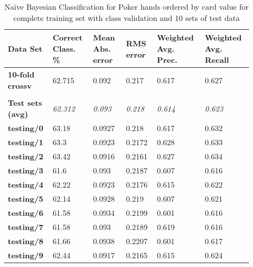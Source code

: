 \documentclass[10pt, a4paper]{article}
\begin{document}
\begin{table}[htbp]
  \centering
  \begin{tabular}{p{3cm}p{1.5cm}p{1.5cm}p{1.5cm}p{1.5cm}p{1.5cm}}
    \toprule
    \textbf{Data Set} & Correct Class. \% & Mean Abs. error & RMS error & Weighted Avg. Prec. & Weighted Avg. Recall \\
    \midrule
    \textbf{10-fold crossv} & 62.715 & 0.092 & 0.217 & 0.617 & 0.627 \\
    \textbf{} &       &       &       &       &  \\
    \textbf{Test sets (avg)} & \textit{62.312} & \textit{0.093} & \textit{0.218} & \textit{0.614} & \textit{0.623} \\
    \textbf{   testing/0} & 63.18 & 0.0927 & 0.218 & 0.617 & 0.632 \\
    \textbf{   testing/1} & 63.3  & 0.0923 & 0.2172 & 0.628 & 0.633 \\
    \textbf{   testing/2} & 63.42 & 0.0916 & 0.2161 & 0.627 & 0.634 \\
    \textbf{   testing/3} & 61.6  & 0.093 & 0.2187 & 0.607 & 0.616 \\
    \textbf{   testing/4} & 62.22 & 0.0923 & 0.2176 & 0.615 & 0.622 \\
    \textbf{   testing/5} & 62.14 & 0.0928 & 0.219 & 0.607 & 0.621 \\
    \textbf{   testing/6} & 61.58 & 0.0934 & 0.2199 & 0.601 & 0.616 \\
    \textbf{   testing/7} & 61.58 & 0.093 & 0.2189 & 0.619 & 0.616 \\
    \textbf{   testing/8} & 61.66 & 0.0938 & 0.2207 & 0.601 & 0.617 \\
    \textbf{   testing/9} & 62.44 & 0.0917 & 0.2165 & 0.615 & 0.624 \\
    \bottomrule
    \end{tabular}%
\caption{Na\"ive Bayesian Classification for Poker hands ordered by card value for complete training set with class validation and 10 sets of test data}   
  \label{tab:nbocresults}%
\end{table}%
\end{document}
